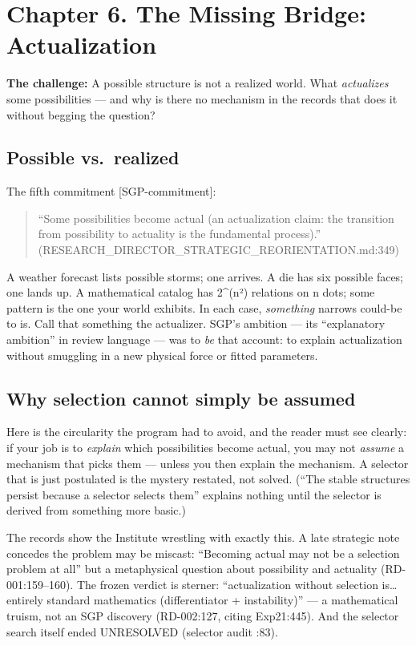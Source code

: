\documentclass[
  11pt,
]{book}
\begin{document}
\chapter{Chapter 6. The Missing Bridge:
Actualization}\label{chapter-6.-the-missing-bridge-actualization}

\textbf{The challenge:} A possible structure is not a realized world.
What \emph{actualizes} some possibilities --- and why is there no
mechanism in the records that does it without begging the question?

\section{Possible vs.~realized}\label{possible-vs.-realized}

The fifth commitment {[}SGP-commitment{]}:

\begin{quote}
``Some possibilities become actual (an actualization claim: the
transition from possibility to actuality is the fundamental process).''
(RESEARCH\_DIRECTOR\_STRATEGIC\_REORIENTATION.md:349)
\end{quote}

A weather forecast lists possible storms; one arrives. A die has six
possible faces; one lands up. A mathematical catalog has 2\^{}(n²)
relations on n dots; some pattern is the one your world exhibits. In
each case, \emph{something} narrows could-be to is. Call that something
the actualizer. SGP's ambition --- its ``explanatory ambition'' in
review language --- was to \emph{be} that account: to explain
actualization without smuggling in a new physical force or fitted
parameters.

\section{Why selection cannot simply be
assumed}\label{why-selection-cannot-simply-be-assumed}

Here is the circularity the program had to avoid, and the reader must
see clearly: if your job is to \emph{explain} which possibilities become
actual, you may not \emph{assume} a mechanism that picks them --- unless
you then explain the mechanism. A selector that is just postulated is
the mystery restated, not solved. (``The stable structures persist
because a selector selects them'' explains nothing until the selector is
derived from something more basic.)

The records show the Institute wrestling with exactly this. A late
strategic note concedes the problem may be miscast: ``Becoming actual
may not be a selection problem at all'' but a metaphysical question
about possibility and actuality (RD-001:159--160). The frozen verdict is
sterner: ``actualization without selection is\ldots{} entirely standard
mathematics (differentiator + instability)'' --- a mathematical truism,
not an SGP discovery (RD-002:127, citing Exp21:445). And the selector
search itself ended UNRESOLVED (selector audit :83).
\end{document}
